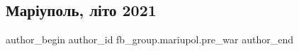  
 
 
 
 

\subsection{Маріуполь, літо 2021}
\label{sec:12_02_2023.fb.fb_group.mariupol.pre_war.10.mar_upol__l_to_2021}

\ifcmt
 author_begin
   author_id fb_group.mariupol.pre_war
 author_end
\fi
